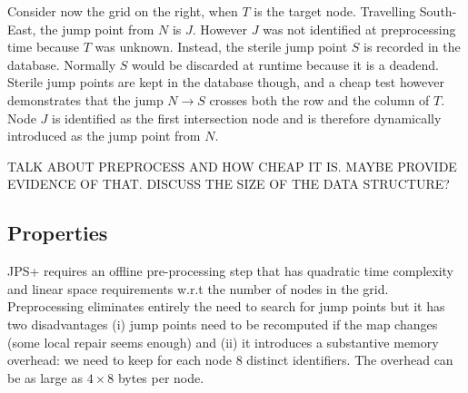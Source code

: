 Consider now the grid on the right, when $T$ is the target node.  
Travelling South-East, the jump point from $N$ is $J$.  
However $J$ was not identified at preprocessing time 
because $T$ was unknown.  
Instead, the sterile jump point $S$ is recorded in the database.  
Normally $S$ would be discarded at runtime 
because it is a deadend.  
Sterile jump points are kept in the database though, 
and a cheap test however demonstrates that the jump $N\rightarrow S$ 
crosses both the row and the column of $T$.  
Node $J$ is identified as the first intersection node 
and is therefore dynamically introduced as the jump point from $N$.  

TALK ABOUT PREPROCESS AND HOW CHEAP IT IS.  
MAYBE PROVIDE EVIDENCE OF THAT.  
DISCUSS THE SIZE OF THE DATA STRUCTURE?

\subsection*{Properties}
JPS+ requires an offline pre-processing step that has quadratic time complexity
and linear space requirements w.r.t the number of nodes in the grid.
Preprocessing eliminates entirely the need to search for jump
points but it has two disadvantages (i) jump points need to be recomputed
if the map changes (some local repair seems enough) and (ii) it introduces 
a substantive memory overhead: we need to keep for each node 8 distinct identifiers. 
The overhead can be as large as $4\times8$ bytes per node. 
